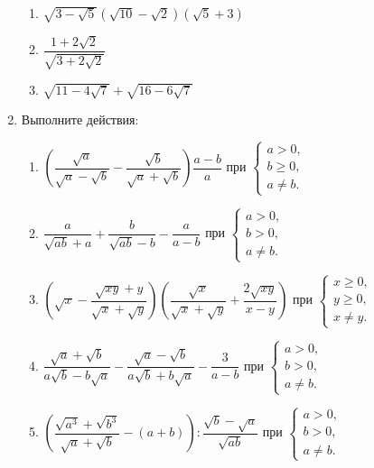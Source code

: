 \documentclass[12pt, a4paper]{article}
\begin{document}
\begin{enumerate}
\begin{enumerate}[label=\textbf{\arabic*)}]
			\item \( \sqrt{3-\sqrt{5}}(\sqrt{10}-\sqrt{2})(\sqrt{5}+3) \)
			\item \( \dfrac{1+2\sqrt{2}}{\sqrt{3+2\sqrt{2}}} \)
			\item \( \sqrt{11-4\sqrt{7}}+\sqrt{16-6\sqrt{7}} \)
		\end{enumerate}
	\item Выполните действия:
		\begin{enumerate}[label=\textbf{\arabic*)}]
			\item \( \left( \dfrac{\sqrt{a}}{\sqrt{a}-\sqrt{b}}-\dfrac{\sqrt{b}}{\sqrt{a}+\sqrt{b}} \right) \dfrac{a-b}{a}\) при
			 \( \left\{
			\begin{array}{l}
				a>0,\\
				b \geqslant0,\\
				a \neq b.
			\end{array}
		\right. \)
		\item \( \dfrac{a}{\sqrt{ab}+a}+\dfrac{b}{\sqrt{ab}-b}-\dfrac{a}{a-b} \) при 
		\( \left\{
		\begin{array}{l}
			a>0,\\
			b >0,\\
			a \neq b.
		\end{array}
		\right. \)
		\item \( \left( \sqrt{x}-\dfrac{\sqrt{xy}+y}{\sqrt{x}+\sqrt{y}} \right)\left( \dfrac{\sqrt{x}}{\sqrt{x}+\sqrt{y}}+\dfrac{2\sqrt{xy}}{x-y} \right) \) при
		\( \left\{
		\begin{array}{l}
			x\geqslant0,\\
			y \geqslant0,\\
			x \neq y.
		\end{array}
		\right. \)
		\item \( \dfrac{\sqrt{a}+\sqrt{b}}{a\sqrt{b}-b\sqrt{a}}-\dfrac{\sqrt{a}-\sqrt{b}}{a\sqrt{b}+b\sqrt{a}}-\dfrac{3}{a-b} \) при
		\( \left\{
		\begin{array}{l}
			a>0,\\
			b>0,\\
			a \neq b.
		\end{array}
		\right. \)
		\item \( \left( \dfrac{\sqrt{a^3}+\sqrt{b^3}}{\sqrt{a}+\sqrt{b}}-(a+b) \right) :\dfrac{\sqrt{b}-\sqrt{a}}{\sqrt{ab}}\) при
		\( \left\{
		\begin{array}{l}
			a>0,\\
			b>0,\\
			a \neq b.
		\end{array}
		\right. \)

\end{enumerate}
\end{enumerate}
\end{document}
